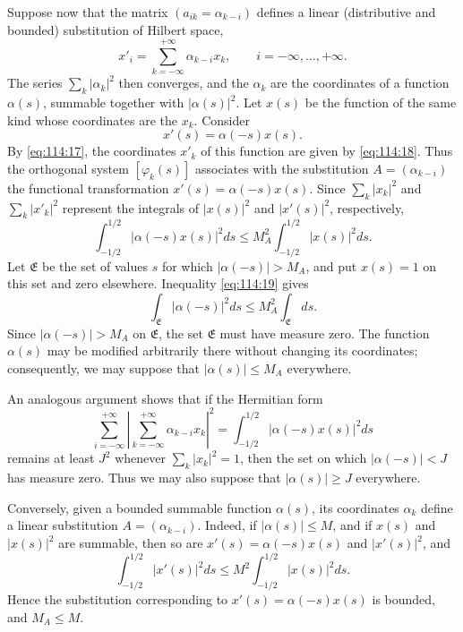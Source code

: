 \documentclass[
  paper=b5,
  fontsize=13pt,
  twoside=true,
  open=any,
  bookmarkpackage=false,
  chapterprefix=true,
  headings=normal
]{scrbook}
\theoremstyle{definition}
\begin{document}
Suppose now that the matrix \((a_{ik}=\alpha_{k-i})\) defines a linear
(distributive and bounded) substitution of Hilbert space,
\begin{equation}
  x'_i=\sum_{k=-\infty}^{+\infty}\alpha_{k-i}x_k,
  \qquad i=-\infty,\ldots,+\infty.
  \tag{18}\label{eq:114:18}
\end{equation}
The series \(\sum_k|\alpha_k|^2\) then converges, and the \(\alpha_k\) are the
coordinates of a function \(\alpha(s)\), summable together with
\(|\alpha(s)|^2\).  Let \(x(s)\) be the function of the same kind whose
coordinates are the \(x_k\).  Consider
\[
  x'(s)=\alpha(-s)x(s).
\]
By \eqref{eq:114:17}, the coordinates \(x'_k\) of this function are given by
\eqref{eq:114:18}.  Thus the orthogonal system \([\varphi_k(s)]\) associates
with the substitution \(A=(\alpha_{k-i})\) the functional transformation
\(x'(s)=\alpha(-s)x(s)\).  Since \(\sum_k|x_k|^2\) and
\(\sum_k|x'_k|^2\) represent the integrals of \(|x(s)|^2\) and
\(|x'(s)|^2\), respectively,
\begin{equation}
  \int_{-1/2}^{1/2}|\alpha(-s)x(s)|^2ds
  \le M_A^2\int_{-1/2}^{1/2}|x(s)|^2ds.
  \tag{19}\label{eq:114:19}
\end{equation}
Let \(\mathfrak E\) be the set of values \(s\) for which
\(|\alpha(-s)|>M_A\), and put \(x(s)=1\) on this set and zero elsewhere.
Inequality \eqref{eq:114:19} gives
\[
  \int_{\mathfrak E}|\alpha(-s)|^2ds\le M_A^2\int_{\mathfrak E}ds.
\]
Since \(|\alpha(-s)|>M_A\) on \(\mathfrak E\), the set \(\mathfrak E\) must
have measure zero.  The function \(\alpha(s)\) may be modified arbitrarily
there
without changing its coordinates; consequently, we may suppose that
\(|\alpha(s)|\le M_A\) everywhere.

An analogous argument shows that if the Hermitian form
\begin{equation}
  \sum_{i=-\infty}^{+\infty}
  \left|\sum_{k=-\infty}^{+\infty}\alpha_{k-i}x_k\right|^2
  =\int_{-1/2}^{1/2}|\alpha(-s)x(s)|^2ds
  \tag{20}\label{eq:114:20}
\end{equation}
remains at least \(J^2\) whenever \(\sum_k|x_k|^2=1\), then the set on which
\(|\alpha(-s)|<J\) has measure zero.  Thus we may also suppose that
\(|\alpha(s)|\ge J\) everywhere.

Conversely, given a bounded summable function \(\alpha(s)\), its coordinates
\(\alpha_k\) define a linear substitution \(A=(\alpha_{k-i})\).  Indeed, if
\(|\alpha(s)|\le M\), and if \(x(s)\) and \(|x(s)|^2\) are summable, then so
are \(x'(s)=\alpha(-s)x(s)\) and \(|x'(s)|^2\), and
\[
  \int_{-1/2}^{1/2}|x'(s)|^2ds
  \le M^2\int_{-1/2}^{1/2}|x(s)|^2ds.
\]
Hence the substitution corresponding to \(x'(s)=\alpha(-s)x(s)\) is bounded,
and \(M_A\le M\).
\end{document}
